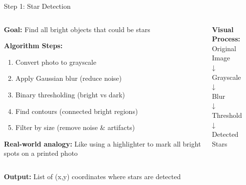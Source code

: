 \documentclass[aspectratio=169]{beamer}
\begin{document}
\begin{frame}{Step 1: Star Detection}
\begin{columns}
\begin{column}{0.6\textwidth}
\textbf{Goal:} Find all bright objects that could be stars

\textbf{Algorithm Steps:}
\begin{enumerate}
\item Convert photo to grayscale
\item Apply Gaussian blur (reduce noise)
\item Binary thresholding (bright vs dark)
\item Find contours (connected bright regions)
\item Filter by size (remove noise \& artifacts)
\end{enumerate}

\textbf{Real-world analogy:}
\textcolor{starblue}{Like using a highlighter to mark all bright spots on a printed photo}
\end{column}

\begin{column}{0.4\textwidth}
\begin{center}
\textbf{Visual Process:}
\\[0.3cm]
Original Image \\
↓ \\
Grayscale \\
↓ \\
Blur \\
↓ \\
Threshold \\
↓ \\
\textcolor{starred}{Detected Stars}
\end{center}
\end{column}
\end{columns}

\vspace{0.5cm}
\textbf{Output:} List of (x,y) coordinates where stars are detected
\end{frame}
\end{document}
